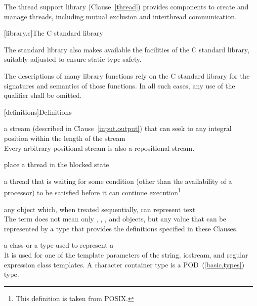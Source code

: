 \pnum
The thread support library (Clause~\ref{thread}) provides components to create
and manage threads, including mutual exclusion and interthread communication.

[library.c]{The C standard library}

\pnum
The \Cpp standard library also makes available the facilities of the C standard library,
%
suitably adjusted to ensure static type safety.

\pnum
The descriptions of many library functions rely on the C standard library for
the signatures and semantics of those functions. In all such cases, any use of
the  qualifier shall be omitted.

[definitions]{Definitions}

%
a stream (described in Clause~\ref{input.output}) that can seek to any integral position within
the length of the stream\\
\enternote Every arbitrary-positional stream is also a repositional stream. \exitnote

%
place a thread in the blocked state

%
a thread that is waiting for some condition (other than the availability of a processor) to be
satisfied before it can continue execution\footnote{This definition is taken from POSIX.}

%
any object which,
when treated sequentially,
can represent text\\
\enternote
The term does not mean only
,
,
,
and
objects,
but any value that can be represented by a type
that provides the definitions specified in these Clauses.
\exitnote

%
a class or a type used to
represent a
\\
\enternote
It is used for one of the template parameters of the string,
iostream, and regular expression class templates.
A character container type is a POD~(\ref{basic.types}) type.
\exitnote

